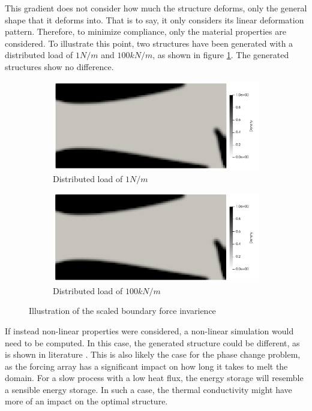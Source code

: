 This gradient does not consider how much the structure deforms, only the general shape that it deforms into. That is to say, it only considers its linear deformation pattern. Therefore, to minimize compliance, only the material properties are considered. To illustrate this point, two structures have been generated with a distributed load of $1N/m$ and $100kN/m$, as shown in figure \ref{fig:force_invarience}. The generated structures show no difference.
\begin{figure}[ht]
  \centering
  \begin{subfigure}[b]{0.47\linewidth}
    \includegraphics[width=\linewidth]{figures/chapter_4/SolidOptF1.png}
    \caption{Distributed load of $1N/m$}
  \end{subfigure}
  \begin{subfigure}[b]{0.47\linewidth}
    \includegraphics[width=\linewidth]{figures/chapter_4/SolidOptF10000.png}
    \caption{Distributed load of $100kN/m$}
  \end{subfigure}
  \caption{Illustration of the scaled boundary force invarience}
  \label{fig:force_invarience}
\end{figure}

If instead non-linear properties were considered, a non-linear simulation would need to be computed. In this case, the generated structure could be different, as is shown in literature \cite{Bendsøe_2004}. This is also likely the case for the phase change problem, as the forcing array has a significant impact on how long it takes to melt the domain. For a slow process with a low heat flux, the energy storage will resemble a sensible energy storage. In such a case, the thermal conductivity might have more of an impact on the optimal structure.


